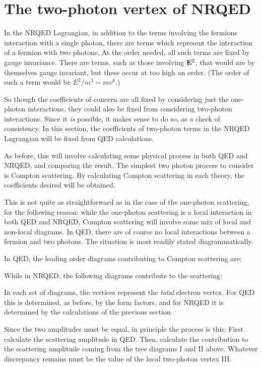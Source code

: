 \section{The two-photon vertex of NRQED}
In the NRQED Lagrangian, in addition to the terms involving the fermions interaction with a single photon, there are terms which represent the interaction of a fermion with two photons.  At the order needed, all such terms are fixed by gauge invariance.  There are terms, such as those involving $\mathbf{E}^2$, that would are by themselves gauge invariant, but these occur at too high an order.  (The order of such a term would be $E^2 / m^3 \sim mv^6$.)

So though the coefficients of concern are all fixed by considering just the one-photon interactions, they could also be fixed from considering two-photon interactions.  Since it {\it is} possible, it makes sense to do so, as a check of consistency.  In this section, the coefficients of two-photon terms in the NRQED Lagrangian will be fixed from QED calculations.

As before, this will involve calculating some physical process in both QED and NRQED, and comparing the result.  The simplest two photon process to consider is Compton scattering.  By calculating Compton scattering in each theory, the coefficients desired will be obtained.

This is not quite as straightforward as in the case of the one-photon scattering, for the following reason: while the one-photon scattering is a local interaction in both QED and NRQED, Compton scattering will involve some mix of local and non-local diagrams.  In QED, there are of course no local interactions between a fermion and two photons.  The situation is most readily stated diagrammatically.

In QED, the leading order diagrams contributing to Compton scattering are:

While in NRQED, the following diagrams contribute to the scattering:

In each set of diagrams, the vertices represent the {\it total} electron vertex.  For QED this is determined, as before, by the form factors, and for NRQED it is determined by the calculations of the previous section.

Since the two amplitudes must be equal, in principle the process is this: First calculate the scattering amplitude in QED.  Then, calculate the contribution to the scattering amplitude coming from the tree diagrams I and II above.  Whatever discrepancy remains must be the value of the local two-photon vertex III.   

